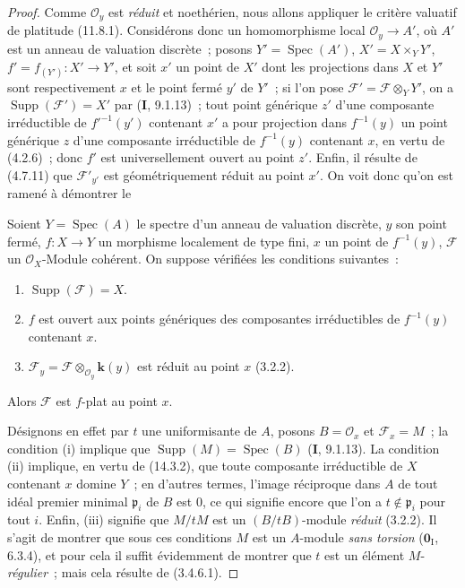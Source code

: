 \begin{proof}
Comme $\mathcal O_y$ est \emph{réduit} et noethérien, nous allons appliquer le critère
valuatif de platitude (11.8.1). Considérons donc un homomorphisme local
$\mathcal O_y\to A'$, où $A'$ est un anneau de valuation discrète~; posons
$Y'=\operatorname{Spec}(A')$, $X'=X\times_Y Y'$, $f'=f_{(Y')}:X'\to Y'$, et
soit $x'$ un point de $X'$ dont les projections dans $X$ et $Y'$ sont
respectivement $x$ et le point fermé $y'$ de $Y'$~; si l'on pose
$\mathcal F'=\mathcal F\otimes_Y Y'$, on a
$\operatorname{Supp}(\mathcal F')=X'$ par (\textbf{I}, 9.1.13)~; tout point
générique $z'$ d'une composante irréductible de $f'^{-1}(y')$ contenant $x'$ a
pour projection dans $f^{-1}(y)$ un point générique $z$ d'une composante
irréductible de $f^{-1}(y)$ contenant $x$, en vertu de (4.2.6)~; donc $f'$ est
universellement ouvert au point $z'$. Enfin, il résulte de (4.7.11) que
$\mathcal F'_{y'}$ est géométriquement réduit au point $x'$. On voit donc qu'on
est ramené à démontrer le

\begin{lemma}[15.2.2.1]
\label{IV.15.2.2.1-fr}
Soient $Y=\operatorname{Spec}(A)$ le spectre d'un anneau de valuation discrète,
$y$ son point fermé, $f:X\to Y$ un morphisme localement de type fini, $x$ un
point de $f^{-1}(y)$, $\mathcal F$ un $\mathcal O_X$-Module cohérent. On suppose
vérifiées les conditions suivantes~:
\begin{enumerate}[label=\textup{(\roman*)}]
  \item $\operatorname{Supp}(\mathcal F)=X$.
  \item $f$ est ouvert aux points génériques des composantes irréductibles de
  $f^{-1}(y)$ contenant $x$.
  \item $\mathcal F_y=\mathcal F\otimes_{\mathcal O_y}\boldsymbol{k}(y)$ est réduit
  au point $x$ \textup{(3.2.2)}.
\end{enumerate}

Alors $\mathcal F$ est $f$-plat au point $x$.
\end{lemma}

Désignons en effet par $t$ une uniformisante de $A$, posons $B=\mathcal O_x$ et
$\mathcal F_x=M$~; la condition (i) implique que
$\operatorname{Supp}(M)=\operatorname{Spec}(B)$ (\textbf{I}, 9.1.13). La
condition (ii) implique, en vertu de (14.3.2), que toute composante irréductible
de $X$ contenant $x$ domine $Y$~; en d'autres termes, l'image réciproque dans $A$
de tout idéal premier minimal $\mathfrak p_i$ de $B$ est $0$, ce qui signifie
encore que l'on a $t\notin\mathfrak p_i$ pour tout $i$. Enfin, (iii) signifie que
$M/tM$ est un $(B/tB)$-module \emph{réduit} (3.2.2). Il s'agit de montrer que
sous ces conditions $M$ est un $A$-module \emph{sans torsion}
($\mathbf{0}_{\mathrm I}$, 6.3.4), et pour cela il suffit évidemment de montrer
que $t$ est un élément $M$-\emph{régulier}~; mais cela résulte de (3.4.6.1).
\end{proof}

